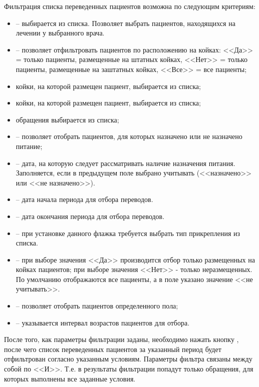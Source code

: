 Фильтрация списка переведенных пациентов возможна по следующим критериям:
\begin{itemize}
 \item {} – выбирается из списка. Позволяет выбрать пациентов, находящихся на лечении у выбранного врача.
 \item {} – позволяет отфильтровать пациентов по расположению на койках: <<Да>> = только пациенты, размещенные на штатных койках, <<Нет>> = только пациенты, размещенные на заштатных койках, <<Все>> = все пациенты;
 \item {} койки, на которой размещен пациент, выбирается из списка;
 \item {} койки, на которой размещен пациент, выбирается из списка;
 \item {} обращения выбирается из списка;
 \item {} – позволяет отобрать пациентов, для которых назначено или не назначено питание;
 \item {} – дата, на которую следует рассматривать наличие назначения питания. Заполняется, если в предыдущем поле выбрано учитывать (<<назначено>> или <<не назначено>>).
 \item {} – дата начала периода для отбора переводов.
 \item {} – дата окончания периода для отбора переводов.
 \item {} – при установке данного флажка требуется выбрать тип прикрепления из списка.
 \item {} – при выборе значения <<Да>> производится отбор только размещенных на койках пациентов; при выборе значения <<Нет>> - только неразмещенных. По умолчанию отображаются все пациенты, а в поле указано значение <<не учитывать>>.
 \item {} – позволяет отобрать пациентов определенного пола;
 \item {} – указывается интервал возрастов пациентов для отбора.
\end{itemize}
 
После того, как параметры фильтрации заданы, необходимо нажать кнопку , после чего список переведенных пациентов за указанный период будет отфильтрован согласно указанным условиям. Параметры фильтра связаны между собой по <<И>>. Т.е. в результаты фильтрации попадут только обращения, для которых выполнены все заданные условия.

